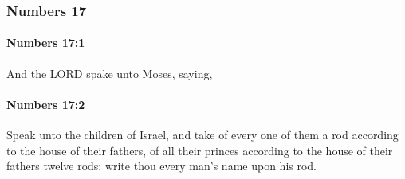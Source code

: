 	\subsubsection{Numbers 17} %
		\label{NUMBERS-17}

		\paragraph{Numbers 17:1} %
			\label{NUMBERS-17-1}

			And the LORD spake unto Moses, saying,


		\paragraph{Numbers 17:2} %
			\label{NUMBERS-17-2}

			Speak unto the children of Israel, and take of every one of them a rod according to the house of their fathers, of all their princes according to the house of their fathers twelve rods: write thou every man’s name upon his rod.

